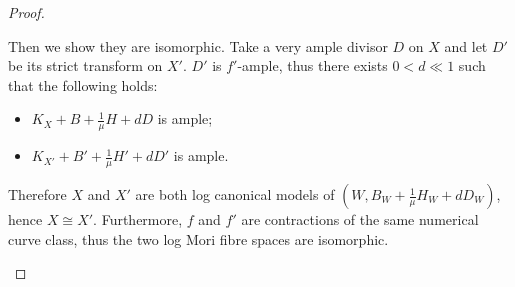 \documentclass[11pt]{amsart}
\begin{document}
\begin{proof}
\begin{enumerate}
Then we show they are isomorphic. Take a very ample divisor $ D $ on $ X $ and let $ D'  $ be its strict transform on $ X' $. $ D' $ is $ f' $-ample, thus there exists $ 0<d\ll1 $ such that the following holds:
      \begin{itemize}
        \item $ K_X+B+\frac{1}{\mu }H+dD $ is ample;
        \item $ K_{X'}+B'+\frac{1}{\mu }H'+dD' $ is ample.
      \end{itemize}
  Therefore $X$ and $X'$ are both log canonical models of $(W,B_{W}+\frac{1}{\mu}H_{W}+dD_{W})$, hence $X\cong X'$. Furthermore, $f$ and  $f'$ are contractions of the same numerical curve class, thus the two log Mori fibre spaces are isomorphic.
\end{enumerate}
\end{proof}
\end{document}
